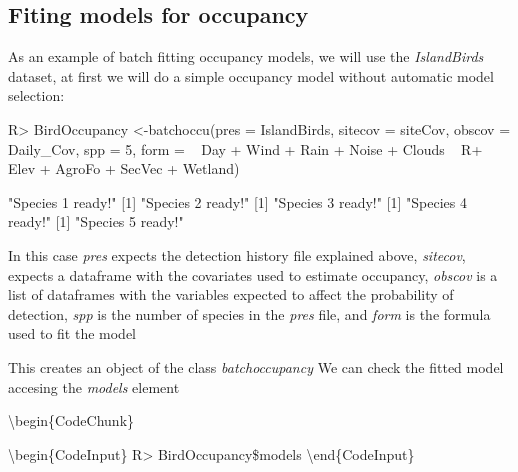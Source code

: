 \documentclass[article]{jss}
\begin{document}
\subsection{Fiting models for
occupancy}\label{fiting-models-for-occupancy}

As an example of batch fitting occupancy models, we will use the
\emph{IslandBirds} dataset, at first we will do a simple occupancy model
without automatic model selection:

\begin{CodeChunk}

\begin{CodeInput}
R> BirdOccupancy <-batchoccu(pres = IslandBirds, sitecov = siteCov, obscov = Daily_Cov, spp =  5, form = ~ Day + Wind + Rain + Noise + Clouds ~
R+ Elev + AgroFo + SecVec + Wetland)
\end{CodeInput}

\begin{CodeOutput}
[1] "Species 1 ready!"
[1] "Species 2 ready!"
[1] "Species 3 ready!"
[1] "Species 4 ready!"
[1] "Species 5 ready!"
\end{CodeOutput}
\end{CodeChunk}

In this case \emph{pres} expects the detection history file explained
above, \emph{sitecov}, expects a dataframe with the covariates used to
estimate occupancy, \emph{obscov} is a list of dataframes with the
variables expected to affect the probability of detection, \emph{spp} is
the number of species in the \emph{pres} file, and \emph{form} is the
formula used to fit the model

This creates an object of the class \emph{batchoccupancy} We can check
the fitted model accesing the \emph{models} element

\textbackslash{}begin\{CodeChunk\}

\textbackslash{}begin\{CodeInput\} R\textgreater{} BirdOccupancy\$models
\textbackslash{}end\{CodeInput\}
\end{document}
